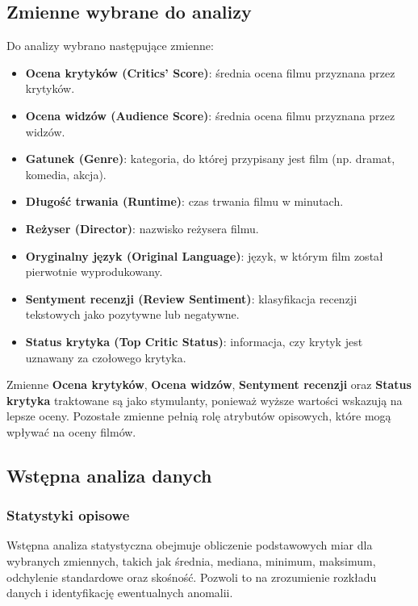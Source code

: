 \documentclass[a4paper,12pt]{article}
\begin{document}
\subsection{Zmienne wybrane do analizy}

Do analizy wybrano następujące zmienne:

\begin{itemize}
    \item \textbf{Ocena krytyków (Critics' Score)}: średnia ocena filmu przyznana przez krytyków.
    \item \textbf{Ocena widzów (Audience Score)}: średnia ocena filmu przyznana przez widzów.
    \item \textbf{Gatunek (Genre)}: kategoria, do której przypisany jest film (np. dramat, komedia, akcja).
    \item \textbf{Długość trwania (Runtime)}: czas trwania filmu w minutach.
    \item \textbf{Reżyser (Director)}: nazwisko reżysera filmu.
    \item \textbf{Oryginalny język (Original Language)}: język, w którym film został pierwotnie wyprodukowany.
    \item \textbf{Sentyment recenzji (Review Sentiment)}: klasyfikacja recenzji tekstowych jako pozytywne lub negatywne.
    \item \textbf{Status krytyka (Top Critic Status)}: informacja, czy krytyk jest uznawany za czołowego krytyka.
\end{itemize}

Zmienne \textbf{Ocena krytyków}, \textbf{Ocena widzów}, \textbf{Sentyment recenzji} oraz \textbf{Status krytyka} traktowane są jako stymulanty, ponieważ wyższe wartości wskazują na lepsze oceny. Pozostałe zmienne pełnią rolę atrybutów opisowych, które mogą wpływać na oceny filmów.

\subsection{Wstępna analiza danych}

\subsubsection{Statystyki opisowe}
Wstępna analiza statystyczna obejmuje obliczenie podstawowych miar dla wybranych zmiennych, takich jak średnia, mediana, minimum, maksimum, odchylenie standardowe oraz skośność. Pozwoli to na zrozumienie rozkładu danych i identyfikację ewentualnych anomalii.
\end{document}
